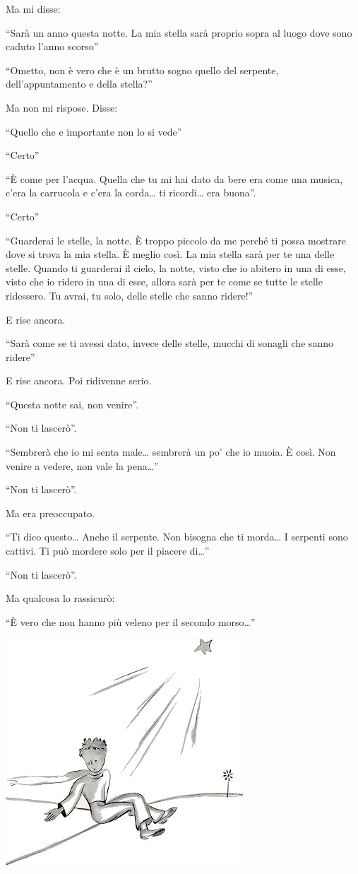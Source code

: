 \documentclass[11pt]{scrbook}
\begin{document}
Ma mi disse:

``Sarà un anno questa notte. La mia stella sarà proprio sopra al luogo dove sono caduto l'anno scorso''

``Ometto, non è vero che è un brutto sogno quello del serpente, dell'appuntamento e della stella?''

Ma non mi rispose. Disse:

``Quello che e importante non lo si vede''

``Certo''

``È come per l'acqua. Quella che tu mi hai dato da bere era come una musica, c'era la carrucola e c'era la corda\ldots{} ti ricordi\ldots{} era buona''.

``Certo''

``Guarderai le stelle, la notte. È troppo piccolo da me perché ti possa mostrare dove si trova la mia stella. È meglio così. La mia stella sarà per te una delle stelle. Quando ti guarderai il cielo, la notte, visto che io abitero in una di esse, visto che io ridero in una di esse, allora sarà per te come se tutte le stelle ridessero. Tu avrai, tu solo, delle stelle che sanno ridere!''

E rise ancora.

``Sarà come se ti avessi dato, invece delle stelle, mucchi di sonagli che sanno ridere''

E rise ancora. Poi ridivenne serio.

``Questa notte sai, non venire''.

``Non ti lascerò''.

``Sembrerà che io mi senta male\ldots{} sembrerà un po' che io muoia. È così. Non venire a vedere, non vale la pena\ldots{}''

``Non ti lascerò''.

Ma era preoccupato.

``Ti dico questo\ldots{} Anche il serpente. Non bisogna che ti morda\ldots{} I serpenti sono cattivi. Ti può mordere solo per il piacere di\ldots{}''

``Non ti lascerò''.

Ma qualcosa lo rassicurò:

``È vero che non hanno più veleno per il secondo morso\ldots{}''

\begin{center}
\includegraphics{img/26b}
\end{center}
\end{document}
